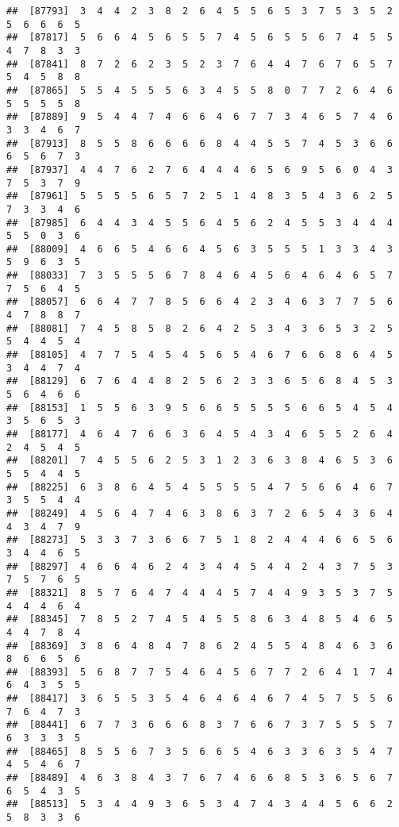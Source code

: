 \documentclass[
]{book}
\begin{document}
\begin{verbatim}
##  [87793]  3  4  4  2  3  8  2  6  4  5  5  6  5  3  7  5  3  5  2  5  6  6  6  5
##  [87817]  5  6  6  4  5  6  5  5  7  4  5  6  5  5  6  7  4  5  5  4  7  8  3  3
##  [87841]  8  7  2  6  2  3  5  2  3  7  6  4  4  7  6  7  6  5  7  5  4  5  8  8
##  [87865]  5  5  4  5  5  5  6  3  4  5  5  8  0  7  7  2  6  4  6  5  5  5  5  8
##  [87889]  9  5  4  4  7  4  6  6  4  6  7  7  3  4  6  5  7  4  6  3  3  4  6  7
##  [87913]  8  5  5  8  6  6  6  6  8  4  4  5  5  7  4  5  3  6  6  6  5  6  7  3
##  [87937]  4  4  7  6  2  7  6  4  4  4  6  5  6  9  5  6  0  4  3  7  5  3  7  9
##  [87961]  5  5  5  5  6  5  7  2  5  1  4  8  3  5  4  3  6  2  5  7  3  3  4  6
##  [87985]  6  4  4  3  4  5  5  6  4  5  6  2  4  5  5  3  4  4  4  5  5  0  3  6
##  [88009]  4  6  6  5  4  6  6  4  5  6  3  5  5  5  1  3  3  4  3  5  9  6  3  5
##  [88033]  7  3  5  5  5  6  7  8  4  6  4  5  6  4  6  4  6  5  7  7  5  6  4  5
##  [88057]  6  6  4  7  7  8  5  6  6  4  2  3  4  6  3  7  7  5  6  4  7  8  8  7
##  [88081]  7  4  5  8  5  8  2  6  4  2  5  3  4  3  6  5  3  2  5  5  4  4  5  4
##  [88105]  4  7  7  5  4  5  4  5  6  5  4  6  7  6  6  8  6  4  5  3  4  4  7  4
##  [88129]  6  7  6  4  4  8  2  5  6  2  3  3  6  5  6  8  4  5  3  5  6  4  6  6
##  [88153]  1  5  5  6  3  9  5  6  6  5  5  5  5  6  6  5  4  5  4  3  5  6  5  3
##  [88177]  4  6  4  7  6  6  3  6  4  5  4  3  4  6  5  5  2  6  4  2  4  5  4  5
##  [88201]  7  4  5  5  6  2  5  3  1  2  3  6  3  8  4  6  5  3  6  5  5  4  4  5
##  [88225]  6  3  8  6  4  5  4  5  5  5  5  4  7  5  6  6  4  6  7  3  5  5  4  4
##  [88249]  4  5  6  4  7  4  6  3  8  6  3  7  2  6  5  4  3  6  4  4  3  4  7  9
##  [88273]  5  3  3  7  3  6  6  7  5  1  8  2  4  4  4  6  6  5  6  3  4  4  6  5
##  [88297]  4  6  6  4  6  2  4  3  4  4  5  4  4  2  4  3  7  5  3  7  5  7  6  5
##  [88321]  8  5  7  6  4  7  4  4  4  5  7  4  4  9  3  5  3  7  5  4  4  4  6  4
##  [88345]  7  8  5  2  7  4  5  4  5  5  8  6  3  4  8  5  4  6  5  4  4  7  8  4
##  [88369]  3  8  6  4  8  4  7  8  6  2  4  5  5  4  8  4  6  3  6  8  6  6  5  6
##  [88393]  5  6  8  7  7  5  4  6  4  5  6  7  7  2  6  4  1  7  4  6  4  3  5  5
##  [88417]  3  6  5  5  3  5  4  6  4  6  4  6  7  4  5  7  5  5  6  7  6  4  7  3
##  [88441]  6  7  7  3  6  6  6  8  3  7  6  6  7  3  7  5  5  5  7  6  3  3  3  5
##  [88465]  8  5  5  6  7  3  5  6  6  5  4  6  3  3  6  3  5  4  7  4  5  4  6  7
##  [88489]  4  6  3  8  4  3  7  6  7  4  6  6  8  5  3  6  5  6  7  6  5  4  3  5
##  [88513]  5  3  4  4  9  3  6  5  3  4  7  4  3  4  4  5  6  6  2  5  8  3  3  6

\end{verbatim}
\end{document}
